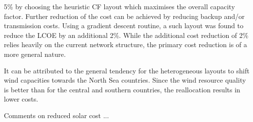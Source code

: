 \documentclass[a4paper, 5p, sort&compress]{elsarticle}%
\begin{document}

5\% by choosing the heuristic CF layout which maximises the
overall capacity factor. Further reduction of the cost can be achieved
by reducing backup and/or transmission costs. Using a gradient descent
routine, a such layout was found to reduce the LCOE by an additional
2\%. While the additional cost reduction of 2\% relies heavily on the
current network structure, the primary cost reduction is of a more
general nature. 

It can be attributed to the general tendency for the
heterogeneous layouts to shift wind capacities towards the North Sea
countries. Since the wind resource quality is better than for the
central and southern countries, the reallocation results in lower
costs.


Comments on reduced solar cost ...



\end{document}
